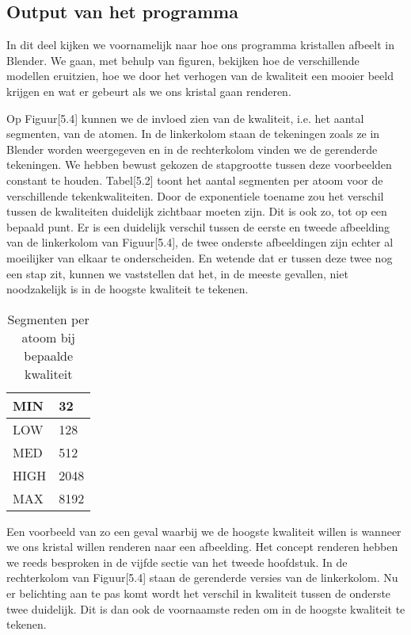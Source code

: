 \subsection{Output van het programma}
In dit deel kijken we voornamelijk naar hoe ons programma kristallen afbeelt in Blender. We gaan, met behulp van figuren, bekijken hoe de verschillende modellen eruitzien, hoe we door het verhogen van de kwaliteit een mooier beeld krijgen en wat er gebeurt als we ons kristal gaan renderen.
\par
Op Figuur[5.4] kunnen we de invloed zien van de kwaliteit, i.e. het aantal segmenten, van de atomen. In de linkerkolom staan de tekeningen zoals ze in Blender worden weergegeven en in de rechterkolom vinden we de gerenderde tekeningen. We hebben bewust gekozen de stapgrootte tussen deze voorbeelden constant te houden. Tabel[5.2] toont het aantal segmenten per atoom voor de verschillende tekenkwaliteiten. Door de exponentiele toename zou het verschil tussen de kwaliteiten duidelijk zichtbaar moeten zijn. Dit is ook zo, tot op een bepaald punt. Er is een duidelijk verschil tussen de eerste en tweede afbeelding van de linkerkolom van Figuur[5.4], de twee onderste afbeeldingen zijn echter al moeilijker van elkaar te onderscheiden. En wetende dat er tussen deze twee nog een stap zit, kunnen we vaststellen dat het, in de meeste gevallen, niet noodzakelijk is in de hoogste kwaliteit te tekenen.   
\par
\begin{table}[H]
\begin{tabular}{|l|l|}
\hline
MIN  & 32   \\ \hline
LOW  & 128  \\ \hline
MED  & 512  \\ \hline
HIGH & 2048 \\ \hline
MAX  & 8192 \\ \hline
\end{tabular}
\caption{Segmenten per atoom bij bepaalde kwaliteit}
\end{table}
\par
Een voorbeeld van zo een geval waarbij we de hoogste kwaliteit willen is wanneer we ons kristal willen renderen naar een afbeelding. Het concept renderen hebben we reeds besproken in de vijfde sectie van het tweede hoofdstuk. In de rechterkolom van Figuur[5.4] staan de gerenderde versies van de linkerkolom. Nu er belichting aan te pas komt wordt het verschil in kwaliteit tussen de onderste twee duidelijk. Dit is dan ook de voornaamste reden om in de hoogste kwaliteit te tekenen.   
\par


